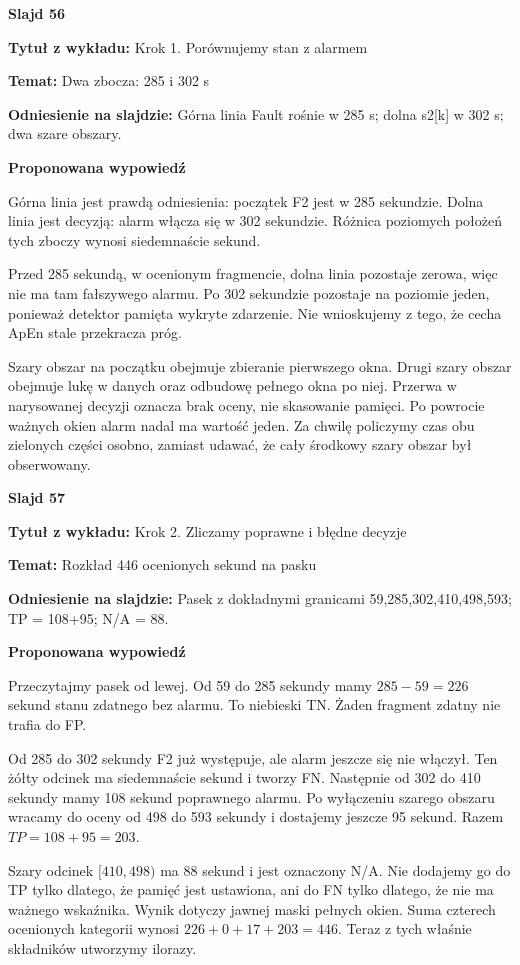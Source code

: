 \documentclass[a4paper,11pt]{article}
\newcommand{\NumerSlajdu}{1}
\newcommand{\Komentarz}[3]{%
  \gdef\NumerSlajdu{#1}%
  {\Large\bfseries Slajd #1\par}\smallskip
  \textbf{Tytuł z wykładu:} #2\par
  \textbf{Temat:} #3\par\medskip
}
\begin{document}
\Komentarz{56}{Krok 1. Porównujemy stan z alarmem}{Dwa zbocza: 285 i 302 s}
{\small\color{black!65}\textbf{Odniesienie na slajdzie:} Górna linia Fault rośnie w 285 s; dolna s2[k] w 302 s; dwa szare obszary.\par}
\medskip
\textbf{Proponowana wypowiedź}\par
Górna linia jest prawdą odniesienia: początek F2 jest w 285 sekundzie. Dolna linia jest decyzją: alarm włącza się w 302 sekundzie. Różnica poziomych położeń tych zboczy wynosi siedemnaście sekund.

Przed 285 sekundą, w ocenionym fragmencie, dolna linia pozostaje zerowa, więc nie ma tam fałszywego alarmu. Po 302 sekundzie pozostaje na poziomie jeden, ponieważ detektor pamięta wykryte zdarzenie. Nie wnioskujemy z tego, że cecha ApEn stale przekracza próg.

Szary obszar na początku obejmuje zbieranie pierwszego okna. Drugi szary obszar obejmuje lukę w danych oraz odbudowę pełnego okna po niej. Przerwa w narysowanej decyzji oznacza brak oceny, nie skasowanie pamięci. Po powrocie ważnych okien alarm nadal ma wartość jeden. Za chwilę policzymy czas obu zielonych części osobno, zamiast udawać, że cały środkowy szary obszar był obserwowany.
\clearpage

\Komentarz{57}{Krok 2. Zliczamy poprawne i błędne decyzje}{Rozkład 446 ocenionych sekund na pasku}
{\small\color{black!65}\textbf{Odniesienie na slajdzie:} Pasek z dokładnymi granicami 59,285,302,410,498,593; TP = 108+95; N/A = 88.\par}
\medskip
\textbf{Proponowana wypowiedź}\par
Przeczytajmy pasek od lewej. Od 59 do 285 sekundy mamy $285-59=226$ sekund stanu zdatnego bez alarmu. To niebieski TN. Żaden fragment zdatny nie trafia do FP.

Od 285 do 302 sekundy F2 już występuje, ale alarm jeszcze się nie włączył. Ten żółty odcinek ma siedemnaście sekund i tworzy FN. Następnie od 302 do 410 sekundy mamy 108 sekund poprawnego alarmu. Po wyłączeniu szarego obszaru wracamy do oceny od 498 do 593 sekundy i dostajemy jeszcze 95 sekund. Razem $TP=108+95=203$.

Szary odcinek $[410,498)$ ma 88 sekund i jest oznaczony N/A. Nie dodajemy go do TP tylko dlatego, że pamięć jest ustawiona, ani do FN tylko dlatego, że nie ma ważnego wskaźnika. Wynik dotyczy jawnej maski pełnych okien. Suma czterech ocenionych kategorii wynosi $226+0+17+203=446$. Teraz z tych właśnie składników utworzymy ilorazy.
\clearpage
\end{document}
